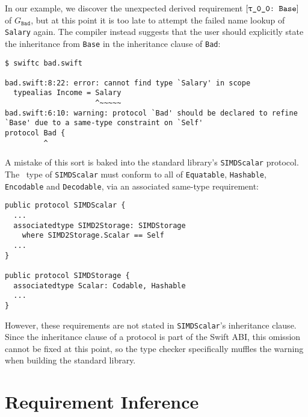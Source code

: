 \documentclass[../generics]{subfiles}
\begin{document}
In our example, we discover the unexpected derived requirement $\ConfReq{\ttgp{0}{0}}{Base}$ of $G_\texttt{Bad}$, but at this point it is too late to attempt the failed name lookup of \texttt{Salary} again. The compiler instead suggests that the user should explicitly state the inheritance from \texttt{Base} in the inheritance clause of \texttt{Bad}:
\begin{Verbatim}
$ swiftc bad.swift

bad.swift:8:22: error: cannot find type `Salary' in scope
  typealias Income = Salary
                     ^~~~~~
bad.swift:6:10: warning: protocol `Bad' should be declared to refine
`Base' due to a same-type constraint on `Self'
protocol Bad {
         ^
\end{Verbatim}

A mistake of this sort is baked into the standard library's \texttt{SIMDScalar} protocol. The \tSelf\ type of \texttt{SIMDScalar} must conform to all of \texttt{Equatable}, \texttt{Hashable}, \texttt{Encodable} and \texttt{Decodable}, via an associated same-type requirement:
\begin{Verbatim}
public protocol SIMDScalar {
  ...
  associatedtype SIMD2Storage: SIMDStorage
    where SIMD2Storage.Scalar == Self
  ...
}

public protocol SIMDStorage {
  associatedtype Scalar: Codable, Hashable
  ...
}
\end{Verbatim}
However, these requirements are not stated in \texttt{SIMDScalar}'s inheritance clause. Since the inheritance clause of a protocol is part of the Swift ABI, this omission cannot be fixed at this point, so the type checker specifically muffles the warning when building the standard library.

\section{Requirement Inference}\label{requirementinference}
\end{document}
